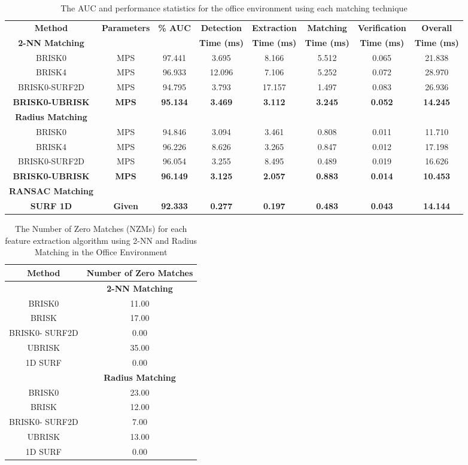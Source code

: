 \documentclass[11pt]{report}
\begin{document}
\begin{table}
\centering
\caption{The AUC and performance statistics for the office environment using
each matching technique}

\footnotesize
\begin{tabular}{|c|c|c|c|c|c|c|c|}
\hline 
\textbf{Method } & \textbf{Parameters} & \textbf{\% AUC} & \textbf{Detection} & \textbf{Extraction} & \textbf{Matching} & \textbf{Verification} & \textbf{Overall}\tabularnewline
\textbf{2-NN Matching} &  &  & \textbf{Time (ms)} & \textbf{Time (ms)} & \textbf{Time (ms)} & \textbf{Time (ms)} & \textbf{Time (ms)}\tabularnewline
\hline 
\hline 
BRISK0 & MPS & 97.441 & 3.695 & 8.166 & 5.512 & 0.065 & 21.838\tabularnewline
\hline 
BRISK4 & MPS & 96.933 & 12.096 & 7.106 & 5.252 & 0.072 & 28.970\tabularnewline
\hline 
BRISK0-SURF2D & MPS & 94.795 & 3.793 & 17.157 & 1.497 & 0.083 & 26.936\tabularnewline
\hline 
\textbf{BRISK0-UBRISK} & \textbf{MPS} & \textbf{95.134} & \textbf{3.469} & \textbf{3.112} & \textbf{3.245} & \textbf{0.052} & \textbf{14.245}\tabularnewline
\hline 
\hline 
\textbf{Radius Matching} &  &  &  &  &  &  & \tabularnewline
\hline 
BRISK0 & MPS & 94.846 & 3.094 & 3.461 & 0.808 & 0.011 & 11.710\tabularnewline
\hline 
BRISK4 & MPS & 96.226 & 8.626 & 3.265 & 0.847 & 0.012 & 17.198\tabularnewline
\hline 
BRISK0-SURF2D & MPS & 96.054 & 3.255 & 8.495 & 0.489 & 0.019 & 16.626\tabularnewline
\hline 
\textbf{BRISK0-UBRISK} & \textbf{MPS} & \textbf{96.149} & \textbf{3.125} & \textbf{2.057} & \textbf{0.883} & \textbf{0.014} & \textbf{10.453}\tabularnewline
\hline 
\hline 
\textbf{RANSAC Matching} &  &  &  &  &  &  & \tabularnewline
\hline 
\textbf{SURF 1D} & \textbf{Given} & \textbf{92.333} & \textbf{0.277} & \textbf{0.197} & \textbf{0.483} & \textbf{0.043} & \textbf{14.144}\tabularnewline
\hline 
\end{tabular}
\label{tab:oe_times}
\end{table}

\begin{table}
\centering
\caption{The Number of Zero Matches (NZMs) for each feature extraction algorithm
using 2-NN and Radius Matching in the Office Environment}
\begin{tabular}{|c|c|}
\hline 
\textbf{Method} & \textbf{Number of Zero Matches}\tabularnewline
\hline 
 & \textbf{2-NN Matching}\tabularnewline
\hline 
\hline 
BRISK0 & 11.00\tabularnewline
\hline 
BRISK & 17.00\tabularnewline
\hline 
BRISK0- SURF2D & 0.00\tabularnewline
\hline 
UBRISK & 35.00\tabularnewline
\hline 
1D SURF & 0.00\tabularnewline
\hline 
 & \textbf{Radius Matching}\tabularnewline
\hline 
BRISK0 & 23.00\tabularnewline
\hline 
BRISK & 12.00\tabularnewline
\hline 
BRISK0- SURF2D & 7.00\tabularnewline
\hline 
UBRISK & 13.00\tabularnewline
\hline 
1D SURF & 0.00\tabularnewline
\hline 
\end{tabular}
\label{tab:oe_izm}
\end{table}
\end{document}
